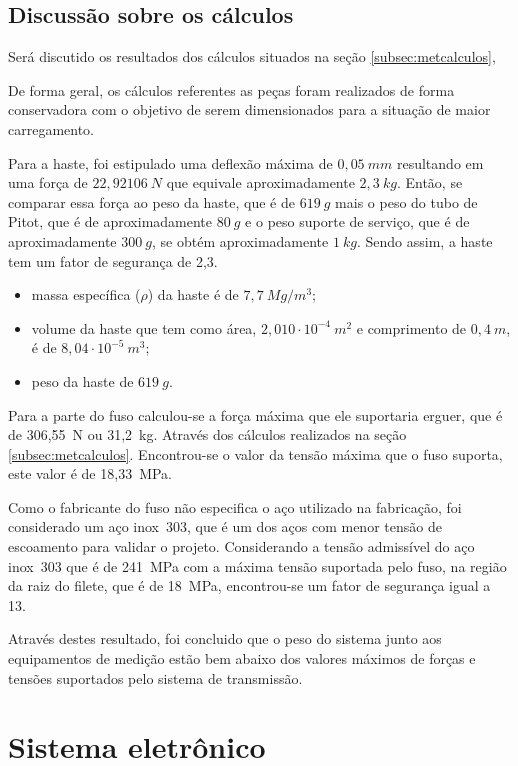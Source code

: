 \subsection{Discussão sobre os cálculos}

Será discutido os resultados dos cálculos situados na seção \ref{subsec:metcalculos}, 

De forma geral, os cálculos referentes as peças foram realizados de forma conservadora 
com o objetivo de serem dimensionados para a situação de maior carregamento.

Para a haste, foi estipulado uma deflexão máxima de $0,05~mm$ resultando em uma força de $22,92106~N$ 
que equivale aproximadamente $2,3~kg$. Então, se comparar essa força ao peso da haste, que é de $619~g$ mais 
o peso do tubo de Pitot, que é de aproximadamente $80~g$ e o peso suporte de serviço, que é de aproximadamente 
$300~g$, se obtém aproximadamente $1~kg$. Sendo assim, a haste tem um fator de segurança de 2,3. 

\begin{itemize}
    \item massa específica ($\rho$) da haste é de $7,7~Mg/m^{3}$;
    \item volume da haste que tem como área, $2,010 \cdot 10^{-4}~m^{2}$ e comprimento de $0,4~m$, é de $8,04 \cdot 10^{-5}~m^{3}$;
    \item peso da haste de $619~g$. 
\end{itemize}

Para a parte do fuso calculou-se a força máxima que ele suportaria erguer, que é de 306,55~N ou 31,2~kg. 
Através dos cálculos realizados na seção \ref{subsec:metcalculos}. Encontrou-se o valor da tensão máxima 
que o fuso suporta, este valor é de 18,33~MPa.

Como o fabricante do fuso não especifica o aço utilizado na fabricação, foi considerado um aço inox~303, 
que é um dos aços com menor tensão de escoamento para validar o projeto. Considerando a tensão admissível 
do aço inox~303 que é de 241~MPa com a máxima tensão suportada pelo fuso, na região da raiz do filete, 
que é de 18~MPa, encontrou-se um fator de segurança igual a 13. 

Através destes resultado, foi concluido que o peso do sistema junto aos equipamentos de medição estão bem 
abaixo dos valores máximos de forças e tensões suportados pelo sistema de transmissão.

\section{Sistema eletrônico}\label{sec:ressisele}




